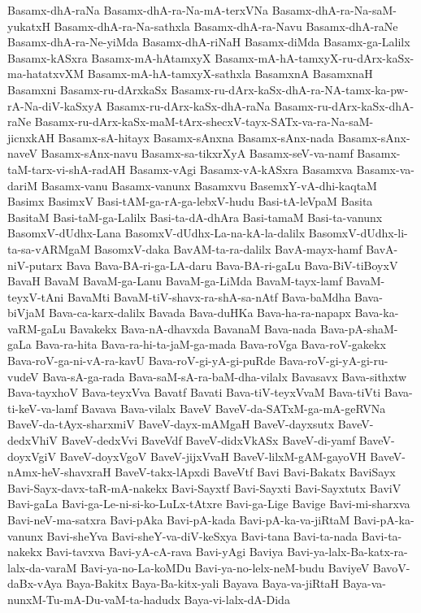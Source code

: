 {Basamx-dhA-raNa
Basamx-dhA-ra-Na-mA-terxVNa
Basamx-dhA-ra-Na-saM-yukatxH
Basamx-dhA-ra-Na-sathxla
Basamx-dhA-ra-Navu
Basamx-dhA-raNe
Basamx-dhA-ra-Ne-yiMda
Basamx-dhA-riNaH
Basamx-diMda
Basamx-ga-Lalilx
Basamx-kASxra
Basamx-mA-hAtamxyX
Basamx-mA-hA-tamxyX-ru-dArx-kaSx-ma-hatatxvXM
Basamx-mA-hA-tamxyX-sathxla
BasamxnA
BasamxnaH
Basamxni
Basamx-ru-dArxkaSx
Basamx-ru-dArx-kaSx-dhA-ra-NA-tamx-ka-pw-rA-Na-diV-kaSxyA
Basamx-ru-dArx-kaSx-dhA-raNa
Basamx-ru-dArx-kaSx-dhA-raNe
Basamx-ru-dArx-kaSx-maM-tArx-shecxV-tayx-SATx-va-ra-Na-saM-jicnxkAH
Basamx-sA-hitayx
Basamx-sAnxna
Basamx-sAnx-nada
Basamx-sAnx-naveV
Basamx-sAnx-navu
Basamx-sa-tikxrXyA
Basamx-seV-va-namf
Basamx-taM-tarx-vi-shA-radAH
Basamx-vAgi
Basamx-vA-kASxra
Basamxva
Basamx-va-dariM
Basamx-vanu
Basamx-vanunx
Basamxvu
BasemxY-vA-dhi-kaqtaM
Basimx
BasimxV
Basi-tAM-ga-rA-ga-lebxV-hudu
Basi-tA-leVpaM
Basita
BasitaM
Basi-taM-ga-Lalilx
Basi-ta-dA-dhAra
Basi-tamaM
Basi-ta-vanunx
BasomxV-dUdhx-Lana
BasomxV-dUdhx-La-na-kA-la-dalilx
BasomxV-dUdhx-li-ta-sa-vARMgaM
BasomxV-daka
BavAM-ta-ra-dalilx
BavA-mayx-hamf
BavA-niV-putarx
Bava
Bava-BA-ri-ga-LA-daru
Bava-BA-ri-gaLu
Bava-BiV-tiBoyxV
BavaH
BavaM
BavaM-ga-Lanu
BavaM-ga-LiMda
BavaM-tayx-lamf
BavaM-teyxV-tAni
BavaMti
BavaM-tiV-shavx-ra-shA-sa-nAtf
Bava-baMdha
Bava-biVjaM
Bava-ca-karx-dalilx
Bavada
Bava-duHKa
Bava-ha-ra-napapx
Bava-ka-vaRM-gaLu
Bavakekx
Bava-nA-dhavxda
BavanaM
Bava-nada
Bava-pA-shaM-gaLa
Bava-ra-hita
Bava-ra-hi-ta-jaM-ga-mada
Bava-roVga
Bava-roV-gakekx
Bava-roV-ga-ni-vA-ra-kavU
Bava-roV-gi-yA-gi-puRde
Bava-roV-gi-yA-gi-ru-vudeV
Bava-sA-ga-rada
Bava-saM-sA-ra-baM-dha-vilalx
Bavasavx
Bava-sithxtw
Bava-tayxhoV
Bava-teyxVva
Bavatf
Bavati
Bava-tiV-teyxVvaM
Bava-tiVti
Bava-ti-keV-va-lamf
Bavava
Bava-vilalx
BaveV
BaveV-da-SATxM-ga-mA-geRVNa
BaveV-da-tAyx-sharxmiV
BaveV-dayx-mAMgaH
BaveV-dayxsutx
BaveV-dedxVhiV
BaveV-dedxVvi
BaveVdf
BaveV-didxVkASx
BaveV-di-yamf
BaveV-doyxVgiV
BaveV-doyxVgoV
BaveV-jijxVvaH
BaveV-lilxM-gAM-gayoVH
BaveV-nAmx-heV-shavxraH
BaveV-takx-lApxdi
BaveVtf
Bavi
Bavi-Bakatx
BaviSayx
Bavi-Sayx-davx-taR-mA-nakekx
Bavi-Sayxtf
Bavi-Sayxti
Bavi-Sayxtutx
BaviV
Bavi-gaLa
Bavi-ga-Le-ni-si-ko-LuLx-tAtxre
Bavi-ga-Lige
Bavige
Bavi-mi-sharxva
Bavi-neV-ma-satxra
Bavi-pAka
Bavi-pA-kada
Bavi-pA-ka-va-jiRtaM
Bavi-pA-ka-vanunx
Bavi-sheYva
Bavi-sheY-va-diV-keSxya
Bavi-tana
Bavi-ta-nada
Bavi-ta-nakekx
Bavi-tavxva
Bavi-yA-cA-rava
Bavi-yAgi
Baviya
Bavi-ya-lalx-Ba-katx-ra-lalx-da-varaM
Bavi-ya-no-La-koMDu
Bavi-ya-no-lelx-neM-budu
BaviyeV
BavoV-daBx-vAya
Baya-Bakitx
Baya-Ba-kitx-yali
Bayava
Baya-va-jiRtaH
Baya-va-nunxM-Tu-mA-Du-vaM-ta-hadudx
Baya-vi-lalx-dA-Dida
}
